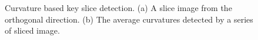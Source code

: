 \documentclass[12pt,letterpaper]{article}
\begin{document}
\begin{figure}[htbp]
  \centering
  \caption{ Curvature based key slice detection. (a) A slice image from the orthogonal direction.
(b) The average curvatures detected by a series of sliced image. }
  \label{HT_BPA_Curvature}
\end{figure}
\end{document}
